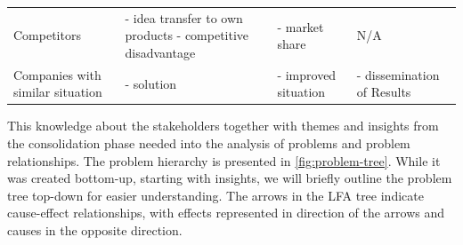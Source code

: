 \begin{longtable}[]{@{}llll@{}}
\begin{minipage}[t]{0.16\columnwidth}
Competitors\strut
\end{minipage} & \begin{minipage}[t]{0.24\columnwidth}\raggedright
- idea transfer to own products - competitive disadvantage\strut
\end{minipage} & \begin{minipage}[t]{0.24\columnwidth}\raggedright
- market share\strut
\end{minipage} & \begin{minipage}[t]{0.24\columnwidth}\raggedright
N/A\strut
\end{minipage}\tabularnewline
\begin{minipage}[t]{0.16\columnwidth}\raggedright
Companies with similar situation\strut
\end{minipage} & \begin{minipage}[t]{0.24\columnwidth}\raggedright
- solution\strut
\end{minipage} & \begin{minipage}[t]{0.24\columnwidth}\raggedright
- improved situation\strut
\end{minipage} & \begin{minipage}[t]{0.24\columnwidth}\raggedright
- dissemination of Results\strut
\end{minipage}\tabularnewline
\bottomrule
\end{longtable}

This knowledge about the stakeholders together with themes and insights from the consolidation phase needed into the analysis of problems and problem relationships.
The problem hierarchy is presented in \cref{fig:problem-tree}.
While it was created bottom-up, starting with insights, we will briefly outline the problem tree top-down for easier understanding.
The arrows in the LFA tree indicate cause-effect relationships, with effects represented in direction of the arrows and causes in the opposite direction.

